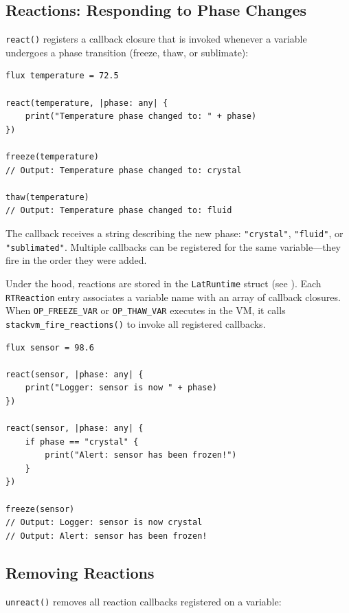 \subsection{Reactions: Responding to Phase Changes}

\lstinline|react()| registers a callback closure that is invoked whenever a variable undergoes a phase transition (freeze, thaw, or sublimate):

\begin{lstlisting}[language=Lattice, caption={Setting up a phase reaction}]
flux temperature = 72.5

react(temperature, |phase: any| {
    print("Temperature phase changed to: " + phase)
})

freeze(temperature)
// Output: Temperature phase changed to: crystal

thaw(temperature)
// Output: Temperature phase changed to: fluid
\end{lstlisting}

The callback receives a string describing the new phase: \lstinline|"crystal"|, \lstinline|"fluid"|, or \lstinline|"sublimated"|.
Multiple callbacks can be registered for the same variable---they fire in the order they were added.

Under the hood, reactions are stored in the \lstinline|LatRuntime| struct (see ).
Each \lstinline|RTReaction| entry associates a variable name with an array of callback closures.
When \lstinline|OP_FREEZE_VAR| or \lstinline|OP_THAW_VAR| executes in the VM, it calls \lstinline|stackvm_fire_reactions()| to invoke all registered callbacks.

\begin{lstlisting}[language=Lattice, caption={Multiple reactions on one variable}]
flux sensor = 98.6

react(sensor, |phase: any| {
    print("Logger: sensor is now " + phase)
})

react(sensor, |phase: any| {
    if phase == "crystal" {
        print("Alert: sensor has been frozen!")
    }
})

freeze(sensor)
// Output: Logger: sensor is now crystal
// Output: Alert: sensor has been frozen!
\end{lstlisting}

\subsection{Removing Reactions}

\lstinline|unreact()| removes all reaction callbacks registered on a variable:

